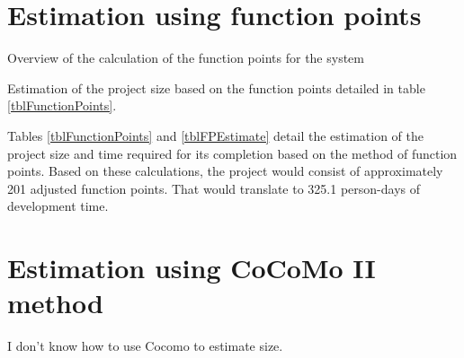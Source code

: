 \section{Estimation using function points}

\begin{table}[hbtp]
\centering

\caption{Overview of the calculation of the function points for the system}
\label{tblFunctionPoints}
\end{table}

\begin{table}[hbtp]
\centering

\caption{Estimation of the project size based on the function points detailed in table \ref{tblFunctionPoints}.}
\label{tblFPEstimate}
\end{table}

Tables \ref{tblFunctionPoints} and \ref{tblFPEstimate} detail the estimation of the project size and time required for its completion based on the method of function points. Based on these calculations, the project would consist of approximately 201 adjusted function points. That would translate to 325.1 person-days of development time.

\section{Estimation using CoCoMo II method}

I don't know how to use Cocomo to estimate size.

